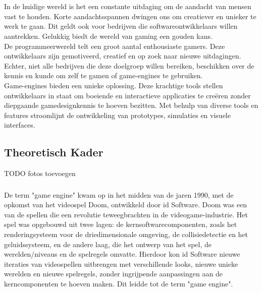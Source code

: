 \chapter{}%
\label{ch:stand-van-zaken}

In de huidige wereld is het een constante uitdaging om de aandacht van mensen vast te houden. Korte aandachtsspannen dwingen ons om creatiever en unieker te werk te gaan. Dit geldt ook voor bedrijven die softwareontwikkelaars willen aantrekken. Gelukkig biedt de wereld van gaming een gouden kans.
\\
De programmeerwereld telt een groot aantal enthousiaste gamers. Deze ontwikkelaars zijn gemotiveerd, creatief en op zoek naar nieuwe uitdagingen. Echter, niet alle bedrijven die deze doelgroep willen bereiken, beschikken over de kennis en kunde om zelf te gamen of game-engines te gebruiken.
\\
Game-engines bieden een unieke oplossing. Deze krachtige tools stellen ontwikkelaars in staat om boeiende en interactieve applicaties te creëren zonder diepgaande gamedesignkennis te hoeven bezitten. Met behulp van diverse tools en features stroomlijnt de ontwikkeling van prototypes, simulaties en visuele interfaces.

\section{Theoretisch Kader}
TODO fotos toevoegen
\subsection{}%
\label{sec:game-engines}
De term "game engine" kwam op in het midden van de jaren 1990, met de opkomst van het videospel Doom, ontwikkeld door id Software. Doom was een van de spellen die een revolutie teweegbrachten in de videogame-industrie. Het spel was opgebouwd uit twee lagen: de kernsoftwarecomponenten, zoals het renderingsysteem voor de driedimensionale omgeving, de collisiedetectie en het geluidssysteem, en de andere laag, die het ontwerp van het spel, de werelden/niveaus en de spelregels omvatte. Hierdoor kon id Software nieuwe iteraties van videospellen uitbrengen met verschillende looks, nieuwe unieke werelden en nieuwe spelregels, zonder ingrijpende aanpassingen aan de kerncomponenten te hoeven maken. Dit leidde tot de term "game engine". \cite{gregory2018game}

